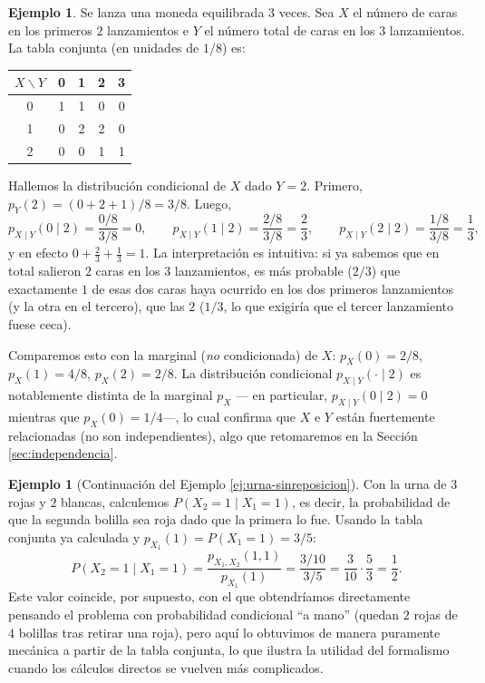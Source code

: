 \documentclass[11pt,a4paper]{article}
\theoremstyle{plain}
\theoremstyle{definition}
\newtheorem{ejemplo}[teorema]{Ejemplo}
\theoremstyle{remark}
\begin{document}
\begin{ejemplo}\label{ej:condicional-moneda}
Se lanza una moneda equilibrada $3$ veces. Sea $X$ el número de caras en los primeros $2$ lanzamientos e $Y$ el número total de caras en los $3$ lanzamientos. La tabla conjunta (en unidades de $1/8$) es:

\begin{table}[h!]
\centering
\begin{tabular}{c|cccc}
\toprule
$X\backslash Y$ & 0 & 1 & 2 & 3 \\
\midrule
0 & 1 & 1 & 0 & 0 \\
1 & 0 & 2 & 2 & 0 \\
2 & 0 & 0 & 1 & 1 \\
\bottomrule
\end{tabular}
\end{table}

Hallemos la distribución condicional de $X$ dado $Y=2$. Primero, $p_Y(2)=(0+2+1)/8=3/8$. Luego,
\[
p_{X\mid Y}(0\mid 2)=\frac{0/8}{3/8}=0, \qquad p_{X\mid Y}(1\mid 2)=\frac{2/8}{3/8}=\frac23, \qquad p_{X\mid Y}(2\mid 2)=\frac{1/8}{3/8}=\frac13,
\]
y en efecto $0+\tfrac23+\tfrac13=1$. La interpretación es intuitiva: si ya sabemos que en total salieron $2$ caras en los $3$ lanzamientos, es más probable ($2/3$) que exactamente $1$ de esas dos caras haya ocurrido en los dos primeros lanzamientos (y la otra en el tercero), que las $2$ ($1/3$, lo que exigiría que el tercer lanzamiento fuese ceca).

Comparemos esto con la marginal (\emph{no} condicionada) de $X$: $p_X(0)=2/8$, $p_X(1)=4/8$, $p_X(2)=2/8$. La distribución condicional $p_{X\mid Y}(\cdot\mid2)$ es notablemente distinta de la marginal $p_X$ — en particular, $p_{X\mid Y}(0\mid2)=0$ mientras que $p_X(0)=1/4$—, lo cual confirma que $X$ e $Y$ están fuertemente relacionadas (no son independientes), algo que retomaremos en la Sección \ref{sec:independencia}.
\end{ejemplo}

\begin{ejemplo}[Continuación del Ejemplo \ref{ej:urna-sinreposicion}]
Con la urna de $3$ rojas y $2$ blancas, calculemos $P(X_2=1\mid X_1=1)$, es decir, la probabilidad de que la segunda bolilla sea roja dado que la primera lo fue. Usando la tabla conjunta ya calculada y $p_{X_1}(1)=P(X_1=1)=3/5$:
\[
P(X_2=1\mid X_1=1) = \frac{p_{X_1,X_2}(1,1)}{p_{X_1}(1)} = \frac{3/10}{3/5} = \frac{3}{10}\cdot\frac{5}{3}=\frac12.
\]
Este valor coincide, por supuesto, con el que obtendríamos directamente pensando el problema con probabilidad condicional ``a mano'' (quedan $2$ rojas de $4$ bolillas tras retirar una roja), pero aquí lo obtuvimos de manera puramente mecánica a partir de la tabla conjunta, lo que ilustra la utilidad del formalismo cuando los cálculos directos se vuelven más complicados.
\end{ejemplo}
\end{document}
